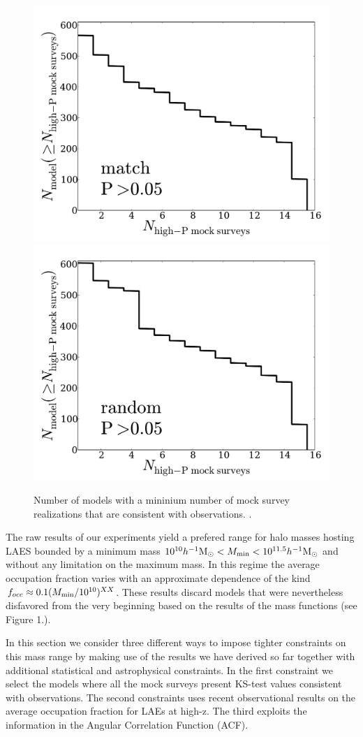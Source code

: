 \documentclass[usenatbib]{mn2e}
\newcommand{\hMsun}{{\ifmmode{h^{-1}{\rm {M_{\odot}}}}\else{$h^{-1}{\rm{M_{\odot}}}$}\fi}}
\begin{document}
\begin{figure}
\begin{center}
\includegraphics[width=0.46\linewidth,angle=0]{./plots/Fig4_match_P5.pdf}
\hspace{5mm}
\includegraphics[width=0.46\linewidth,angle=0]{./plots/Fig4_random_P5.pdf}
\end{center} 
\caption{ Number of models with a mininium number of mock survey
  realizations that are consistent with observations.
  \label{figure:high_success_rate}.}  
\end{figure}

The raw results of our experiments yield a prefered range for
halo masses hosting LAES bounded by a minimum mass $10^{10}\hMsun<M_{\rm
  min}<10^{11.5}\hMsun$ and without any limitation on the  maximum
mass. In this regime the average occupation fraction varies with an
approximate dependence of the kind $f_{occ}\approx 0.1 (M_{\rm
  min}/10^{10})^{XX}$. These results discard models that were
nevertheless disfavored from the very beginning based on the results
of the mass functions (see Figure 1.).  
 

In this section we consider three different ways to impose
tighter constraints on this mass range by making use of the results we
have derived so far together with additional statistical and
astrophysical constraints. In the first constraint we select the
models where all the mock surveys present KS-test values consistent
with observations. The second constraints uses recent observational
results on the average occupation fraction for LAEs at high-z. The
third exploits the information in the Angular Correlation Function
(ACF).  
\end{document}

